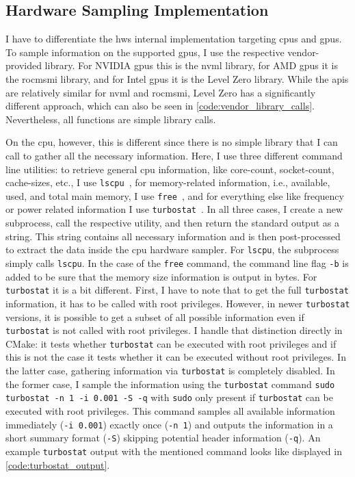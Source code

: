 \subsection{Hardware Sampling Implementation}

I have to differentiate the hws internal implementation targeting \glspl{cpu} and \glspl{gpu}.
To sample information on the supported \glspl{gpu}, I use the respective vendor-provided library. 
For NVIDIA \glspl{gpu} this is the \gls{nvml} library, for AMD \glspl{gpu} it is the \gls{rocmsmi} library, and for Intel \glspl{gpu} it is the Level Zero library. 
While the \glspl{api} are relatively similar for \gls{nvml} and \gls{rocmsmi}, Level Zero has a significantly different approach, which can also be seen in \autoref{code:vendor_library_calls}. 
Nevertheless, all functions are simple library calls.

On the \gls{cpu}, however, this is different since there is no simple library that I can call to gather all the necessary information. 
Here, I use three different command line utilities: to retrieve general \gls{cpu} information, like core-count, socket-count, cache-sizes, etc., I use \texttt{lscpu}~\cite{qian_lscpu_nodate}, for memory-related information, i.e., available, used, and total main memory, I use \texttt{free}~\cite{small_free_nodate}, and for everything else like frequency or power related information I use \texttt{turbostat}~\cite{brown_turbostat_nodate}. 
In all three cases, I create a new subprocess, call the respective utility, and then return the standard output as a string. 
This string contains all necessary information and is then post-processed to extract the data inside the \gls{cpu} hardware sampler. 
For \texttt{lscpu}, the subprocess simply calls \texttt{lscpu}. 
In the case of the \texttt{free} command, the command line flag \texttt{-b} is added to be sure that the memory size information is output in bytes. 
For \texttt{turbostat} it is a bit different. 
First, I have to note that to get the full \texttt{turbostat} information, it has to be called with root privileges. 
However, in newer \texttt{turbostat} versions, it is possible to get a subset of all possible information even if \texttt{turbostat} is not called with root privileges. 
I handle that distinction directly in CMake: it tests whether \texttt{turbostat} can be executed with root privileges and if this is not the case it tests whether it can be executed without root privileges. 
In the latter case, gathering information via \texttt{turbostat} is completely disabled. 
In the former case, I sample the information using the \texttt{turbostat} command \texttt{sudo turbostat -n 1 -i 0.001 -S -q} with \texttt{sudo} only present if \texttt{turbostat} can be executed with root privileges. 
This command samples all available information immediately (\texttt{-i 0.001}) exactly once (\texttt{-n 1}) and outputs the information in a short summary format (\texttt{-S}) skipping potential header information (\texttt{-q}). 
An example \texttt{turbostat} output with the mentioned command looks like displayed in \autoref{code:turbostat_output}. 


